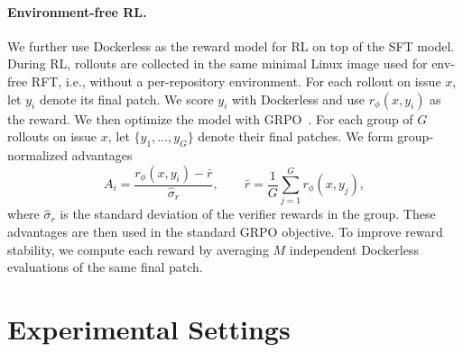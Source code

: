 \documentclass{llmxive}
\providecommand{\approach}{Dockerless\xspace}
\providecommand{\zeng}[1]{\textbf{[Zeng: #1]}}
\begin{document}
\paragraph{Environment-free RL.}
We further use \approach as the reward model for RL on top of the SFT model. During RL, rollouts are collected in the same minimal Linux image used for env-free RFT, i.e., without a per-repository environment.
For each rollout on issue \(x\), let \(y_i\) denote its final patch. We score \(y_i\) with \approach and use \(r_\phi(x,y_i)\) as the reward.
We then optimize the model with GRPO~\citep{shao2024deepseekmath}. For each group of $G$ rollouts on issue $x$, let \(\{y_1,\dots,y_G\}\) denote their final patches. We form group-normalized advantages
\begin{equation}
  A_i = \frac{r_\phi(x, y_i) - \bar{r}}{\hat{\sigma}_r}, \qquad \bar{r} = \frac{1}{G}\sum_{j=1}^G r_\phi(x, y_j),
  \label{eq:grpo-advantage}
\end{equation}
where \(\hat{\sigma}_r\) is the standard deviation of the verifier rewards in the group. These advantages are then used in the standard GRPO objective.
To improve reward stability, we compute each reward by averaging \(M\) independent \approach evaluations of the same final patch.



\section{Experimental Settings}
\label{sec:setup}
\end{document}

